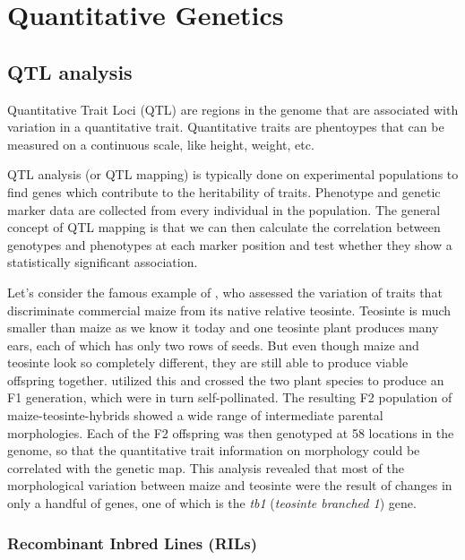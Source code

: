 \documentclass[12pt,]{krantz}
\theoremstyle{definition}
\theoremstyle{definition}
\theoremstyle{remark}
\begin{document}
\chapter{Quantitative Genetics}\label{quantitative-genetics}

\section{QTL analysis}\label{qtl-analysis}

Quantitative Trait Loci (QTL) are regions in the genome that are
associated with variation in a quantitative trait. Quantitative traits
are phentoypes that can be measured on a continuous scale, like height,
weight, etc.

QTL analysis (or QTL mapping) is typically done on experimental
populations to find genes which contribute to the heritability of
traits. Phenotype and genetic marker data are collected from every
individual in the population. The general concept of QTL mapping is that
we can then calculate the correlation between genotypes and phenotypes
at each marker position and test whether they show a statistically
significant association.

Let's consider the famous example of \citet{Doebley285}, who assessed
the variation of traits that discriminate commercial maize from its
native relative teosinte. Teosinte is much smaller than maize as we know
it today and one teosinte plant produces many ears, each of which has
only two rows of seeds. But even though maize and teosinte look so
completely different, they are still able to produce viable offspring
together. \citet{Doebley285} utilized this and crossed the two plant
species to produce an F1 generation, which were in turn self-pollinated.
The resulting F2 population of maize-teosinte-hybrids showed a wide
range of intermediate parental morphologies. Each of the F2 offspring
was then genotyped at 58 locations in the genome, so that the
quantitative trait information on morphology could be correlated with
the genetic map. This analysis revealed that most of the morphological
variation between maize and teosinte were the result of changes in only
a handful of genes, one of which is the \emph{tb1} (\emph{teosinte
branched 1}) gene.

\subsection{Recombinant Inbred Lines
(RILs)}\label{recombinant-inbred-lines-rils}
\end{document}
